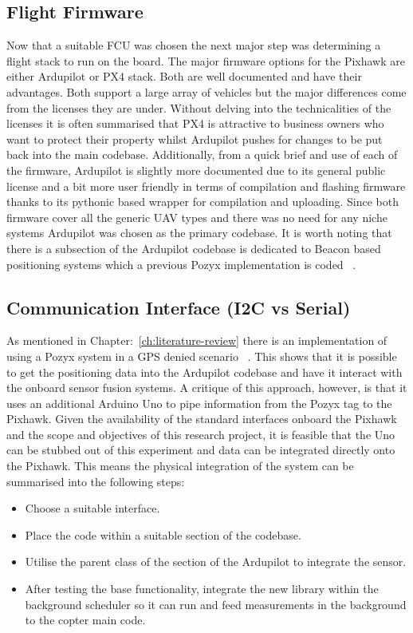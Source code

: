\subsection{Flight Firmware}\label{subsec:flight-firmware}
Now that a suitable FCU was chosen the next major step was determining a flight stack to run on the board.
The major firmware options for the Pixhawk are either Ardupilot or PX4 stack.
Both are well documented and have their advantages.
Both support a large array of vehicles but the major differences come from the licenses they are under.
Without delving into the technicalities of the licenses it is often summarised that PX4 is attractive to business owners who want to protect their property whilst Ardupilot pushes for changes to be put back into the main codebase.
Additionally, from a quick brief and use of each of the firmware, Ardupilot is slightly more documented due to its general public license and a bit more user friendly in terms of compilation and flashing firmware thanks to its pythonic based wrapper for compilation and uploading.
Since both firmware cover all the generic UAV types and there was no need for any niche systems Ardupilot was chosen as the primary codebase.
It is worth noting that there is a subsection of the Ardupilot codebase is dedicated to Beacon based positioning systems which a previous Pozyx implementation is coded ~\cite{ardupilotarduino}.

\subsection{Communication Interface (I2C vs Serial)}\label{subsec:communication-interfacei2c-vs-serial}
As mentioned in Chapter:~\ref{ch:literature-review} there is an implementation of using a Pozyx system in a GPS denied scenario ~\cite{ardupilotarduino}.
This shows that it is possible to get the positioning data into the Ardupilot codebase and have it interact with the onboard sensor fusion systems.
A critique of this approach, however, is that it uses an additional Arduino Uno to pipe information from the Pozyx tag to the Pixhawk.
Given the availability of the standard interfaces onboard the Pixhawk and the scope and objectives of this research project, it is feasible that the Uno can be stubbed out of this experiment and data can be integrated directly onto the Pixhawk.
This means the physical integration of the system can be summarised into the following steps:
\begin{itemize}
    \item Choose a suitable interface.
    \item Place the code within a suitable section of the codebase.
    \item Utilise the parent class of the section of the Ardupilot to integrate the sensor.
    \item After testing the base functionality, integrate the new library within the background scheduler so it can run and feed measurements in the background to the copter main code.
\end{itemize}

